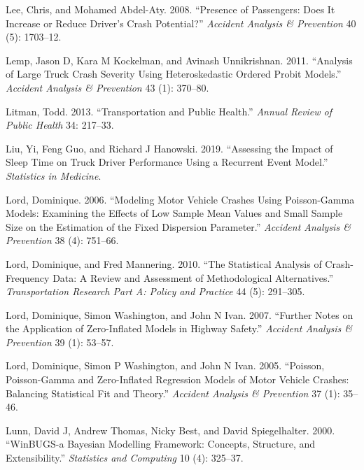 \documentclass[12pt]{book}
\numberwithin{equation}{chapter}
\begin{document}
\leavevmode\hypertarget{ref-lee2008presence}{}%
Lee, Chris, and Mohamed Abdel-Aty. 2008. ``Presence of Passengers: Does It Increase or Reduce Driver's Crash Potential?'' \emph{Accident Analysis \& Prevention} 40 (5): 1703--12.

\leavevmode\hypertarget{ref-lemp2011analysis}{}%
Lemp, Jason D, Kara M Kockelman, and Avinash Unnikrishnan. 2011. ``Analysis of Large Truck Crash Severity Using Heteroskedastic Ordered Probit Models.'' \emph{Accident Analysis \& Prevention} 43 (1): 370--80.

\leavevmode\hypertarget{ref-litman2013transportation}{}%
Litman, Todd. 2013. ``Transportation and Public Health.'' \emph{Annual Review of Public Health} 34: 217--33.

\leavevmode\hypertarget{ref-liu2019assessing}{}%
Liu, Yi, Feng Guo, and Richard J Hanowski. 2019. ``Assessing the Impact of Sleep Time on Truck Driver Performance Using a Recurrent Event Model.'' \emph{Statistics in Medicine}.

\leavevmode\hypertarget{ref-lord2006modeling}{}%
Lord, Dominique. 2006. ``Modeling Motor Vehicle Crashes Using Poisson-Gamma Models: Examining the Effects of Low Sample Mean Values and Small Sample Size on the Estimation of the Fixed Dispersion Parameter.'' \emph{Accident Analysis \& Prevention} 38 (4): 751--66.

\leavevmode\hypertarget{ref-lord2010statistical}{}%
Lord, Dominique, and Fred Mannering. 2010. ``The Statistical Analysis of Crash-Frequency Data: A Review and Assessment of Methodological Alternatives.'' \emph{Transportation Research Part A: Policy and Practice} 44 (5): 291--305.

\leavevmode\hypertarget{ref-lord2007further}{}%
Lord, Dominique, Simon Washington, and John N Ivan. 2007. ``Further Notes on the Application of Zero-Inflated Models in Highway Safety.'' \emph{Accident Analysis \& Prevention} 39 (1): 53--57.

\leavevmode\hypertarget{ref-lord2005poisson}{}%
Lord, Dominique, Simon P Washington, and John N Ivan. 2005. ``Poisson, Poisson-Gamma and Zero-Inflated Regression Models of Motor Vehicle Crashes: Balancing Statistical Fit and Theory.'' \emph{Accident Analysis \& Prevention} 37 (1): 35--46.

\leavevmode\hypertarget{ref-lunn2000winbugs}{}%
Lunn, David J, Andrew Thomas, Nicky Best, and David Spiegelhalter. 2000. ``WinBUGS-a Bayesian Modelling Framework: Concepts, Structure, and Extensibility.'' \emph{Statistics and Computing} 10 (4): 325--37.
\end{document}
